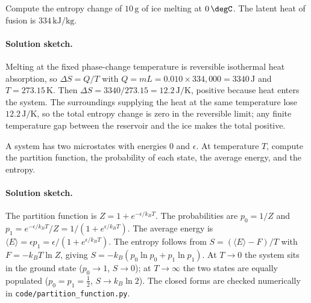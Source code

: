 \begin{exercise}
Compute the entropy change of $10\,\text{g}$ of ice melting at
$0\,\degC$. The latent heat of fusion is $334\,\text{kJ}/\text{kg}$.

\paragraph{Solution sketch.} Melting at the fixed phase-change
temperature is reversible isothermal heat absorption, so
$\Delta S = Q/T$ with $Q = mL = 0.010 \times 334{,}000 = 3340\,\text{J}$
and $T = 273.15\,\si{\kelvin}$. Then
$\Delta S = 3340/273.15 = 12.2\,\si{\joule\per\kelvin}$, positive
because heat enters the system. The surroundings supplying the heat at
the same temperature lose $12.2\,\si{\joule\per\kelvin}$, so the total
entropy change is zero in the reversible limit; any finite temperature
gap between the reservoir and the ice makes the total positive.
\end{exercise}

\begin{exercise}
A system has two microstates with energies $0$ and $\epsilon$. At
temperature $T$, compute the partition function, the probability of
each state, the average energy, and the entropy.

\paragraph{Solution sketch.} The partition function is
$Z = 1 + e^{-\epsilon/k_B T}$. The probabilities are
$p_0 = 1/Z$ and $p_1 = e^{-\epsilon/k_B T}/Z = 1/(1 + e^{\epsilon/k_B T})$.
The average energy is
$\langle E \rangle = \epsilon p_1 = \epsilon/(1 + e^{\epsilon/k_B T})$.
The entropy follows from $S = (\langle E \rangle - F)/T$ with
$F = -k_B T \ln Z$, giving
$S = -k_B(p_0 \ln p_0 + p_1 \ln p_1)$. At $T \to 0$ the system sits in
the ground state ($p_0 \to 1$, $S \to 0$); at $T \to \infty$ the two
states are equally populated ($p_0 = p_1 = \tfrac12$,
$S \to k_B \ln 2$). The closed forms are checked numerically in
\texttt{code/partition\_function.py}.
\end{exercise}

